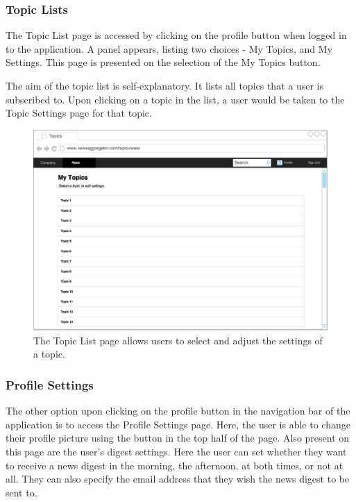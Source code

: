 \documentclass[12pt]{article}
\begin{document}
\subsubsection{Topic Lists}

The Topic List page is accessed by clicking on the profile button when logged in to the application. A panel appears, listing two choices - My Topics, and My Settings. This page is presented on the selection of the My Topics button.

The aim of the topic list is self-explanatory. It lists all topics that a user is subscribed to. Upon clicking on a topic in the list, a user would be taken to the Topic Settings page for that topic.

\begin{figure}[ht!]
  \centering
    \includegraphics[scale=0.3]{UserTopics.png}
   \caption[A wireframe of the Topic List page]{The Topic List page allows users to select and adjust the settings of a topic.}
   \label{userTopics}
\end{figure} 

\subsubsection{Profile Settings}

The other option upon clicking on the profile button in the navigation bar of the application is to access the Profile Settings page. Here, the user is able to change their profile picture using the button in the top half of the page. Also present on this page are the user's digest settings. Here the user can set whether they want to receive a news digest in the morning, the afternoon, at both times, or not at all. They can also specify the email address that they wish the news digest to be sent to.
\end{document}

